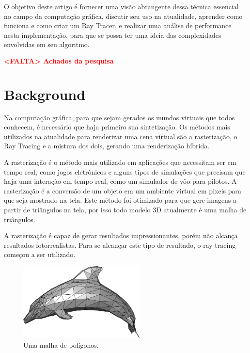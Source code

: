 \documentclass[journal]{IEEEtran}
\begin{document}
O objetivo deste artigo é fornecer uma visão abrangente dessa técnica essencial
no campo da computação gráfica, discutir seu uso na atualidade, aprender como
funciona e como criar um Ray Tracer, e realizar uma análise de performance nesta
implementação, para que se possa ter uma ideia das complexidades envolvidas em
seu algoritmo.

\textcolor{red}{\textbf{<FALTA> Achados da pesquisa}}

\section{Background}

Na computação gráfica, para que sejam gerados os mundos virtuais que todos conhecem,
é necessário que haja primeiro sua sintetização. Os métodos mais utilizados na atualidade
para renderizar uma cena virtual são a rasterização, o Ray Tracing e a mistura dos dois,
gerando uma renderização híbrida.

A rasterização é o método mais utilizado em aplicações que necessitam ser em tempo
real, como jogos eletrônicos e alguns tipos de simulações que precisam que haja
uma interação em tempo real, como um simulador de vôo para pilotos. A rasterização
é a conversão de um objeto em um ambiente virtual em pixeis para que seja mostrado
na tela. Este método foi otimizado para que gere imagens a partir de triângulos na
tela, por isso todo modelo 3D atualmente é uma malha de triângulos.
\cite{c12}

A rasterização é capaz de gerar resultados impressionantes, porém não alcança 
resultados fotorrealistas. Para se alcançar este tipo de resultado, o ray tracing
começou a ser utilizado.

\begin{figure}[!t]
\centering
\includegraphics[width=2.5in]{media/mesh.png}
\caption{Uma malha de polígonos.}
\label{fig_sim}
\end{figure}
\end{document}
